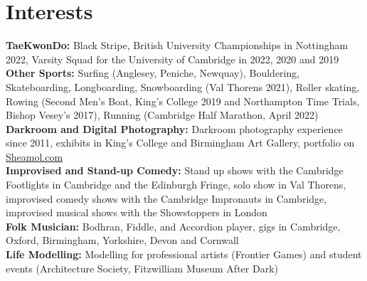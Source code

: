 \documentclass{article}
\begin{document}
\section*{Interests}
\textbf{TaeKwonDo:} Black Stripe, British University Championships in Nottingham 2022, Varsity Squad for the University of Cambridge in 2022, 2020 and 2019\\
\textbf{Other Sports:} Surfing (Anglesey, Peniche, Newquay), Bouldering, Skateboarding, Longboarding, Snowboarding (Val Thorens 2021), Roller skating, Rowing (Second Men's Boat, King's College 2019 and Northampton Time Trials, Bishop Vesey's 2017), Running (Cambridge Half Marathon, April 2022)\\
\textbf{Darkroom and Digital Photography:} Darkroom photography experience since 2011,  exhibits in King's College and Birmingham Art Gallery, portfolio on \href{www.sheamol.com}{Sheamol.com}\\
\textbf{Improvised and Stand-up Comedy:} Stand up shows with the Cambridge Footlights in Cambridge and the Edinburgh Fringe, solo show in Val Thorens, improvised comedy shows with the Cambridge Impronauts in Cambridge, improvised musical shows with the Showstoppers in London \\
\textbf{Folk Musician:} Bodhran, Fiddle, and Accordion %
player, gigs in Cambridge, Oxford, Birmingham, Yorkshire, Devon and Cornwall \\ %
\textbf{Life Modelling:} Modelling for professional artists (Frontier Games) and student events (Architecture Society, Fitzwilliam Museum After Dark)\medskip

\vspace{-.75\baselineskip}
\hrulefill
\vspace{-.75\baselineskip}
\end{document}
